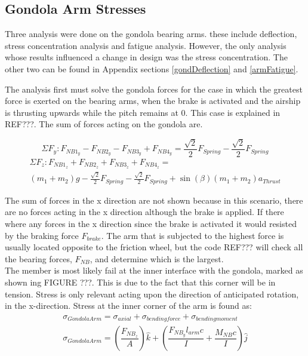 \documentclass[../main.tex]{subfiles}
\begin{document}
\subsection{Gondola Arm Stresses} \label{bearingArm}
Three analysis were done on the gondola bearing arms. these include deflection, stress concentration analysis and fatigue analysis. However, the only analysis whose results influenced a change in design was the stress concentration. The other two can be found in Appendix sections \ref{gondDeflection} and \ref{armFatigue}.

The analysis first must solve the gondola forces for the case in which the greatest force is exerted on the bearing arms, when the brake is activated and the airship is thrusting upwards while the pitch remains at 0. This case is explained in REF???. The sum of forces acting on the gondola are. 

\begin{equation} \label{FygondLA}
\Sigma F_{y} : F_{NB1_{y}} - F_{NB2_{y}} - F_{NB3_{y}} + F_{NB4_{y}} = \frac{\sqrt{2}}{2} F_{Spring} -\frac{\sqrt{2}}{2} F_{Spring} 
\end{equation}
\begin{multline} \label{FzgondLA}
\Sigma F_{z} : F_{NB1_{z}} + F_{NB2_{z}} + F_{NB3_{z}} + F_{NB4_{z}} =\\ (m_{1} + m_2)g - \frac{\sqrt{2}}{2} F_{Spring} - \frac{\sqrt{2}}{2} F_{Spring} + \sin(\beta) (m_1+m_2) a_{Thrust}
\end{multline}
 

The sum of forces in the x direction are not shown because in this scenario, there are no forces acting in the x direction although the brake is applied. If there where any forces in the x direction since the brake is activated it would resisted by the braking force $F_{brake}$. The arm that is subjected to the highest force is usually located opposite to the friction wheel, but the code REF??? will check all the bearing forces, $F_{NB}$, and determine which is the largest. \\

The member is most likely fail at the inner interface with the gondola, marked as shown ing FIGURE ???. This is due to the fact that this corner will be in tension. Stress is only relevant acting upon the direction of anticipated rotation, in the x-direction. Stress at the inner corner of the arm is found as:
\begin{align}
	\sigma _{Gondola Arm} = \sigma _{axial} + \sigma _{bending force} + \sigma _{bending moment} \\ \label{armStress}
	\sigma _{Gondola Arm}  = \left(\dfrac{F_{NB_{z}}}{A}\right)\hat{k} + \left(\dfrac{F_{NB_{y}}l_{arm}c}{I}  + \dfrac{M_{NB}c}{I} \right) \hat{j}
\end{align}
\end{document}
